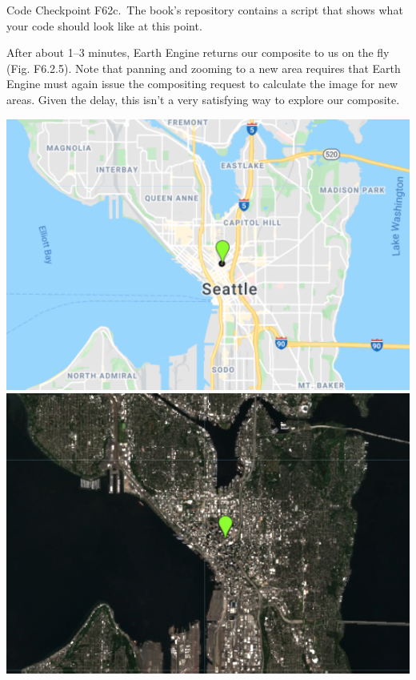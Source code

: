 \documentclass[
  letterpaper,
  DIV=11,
  numbers=noendperiod]{scrreprt}
\begin{document}
\begin{tcolorbox}[enhanced jigsaw, left=2mm, breakable, rightrule=.15mm, opacityback=0, colframe=quarto-callout-note-color-frame, colbacktitle=quarto-callout-note-color!10!white, arc=.35mm, opacitybacktitle=0.6, toptitle=1mm, colback=white, leftrule=.75mm, title=\textcolor{quarto-callout-note-color}{\faInfo}\hspace{0.5em}{Note}, toprule=.15mm, bottomtitle=1mm, titlerule=0mm, bottomrule=.15mm, coltitle=black]

Code Checkpoint F62c.~The book's repository contains a script that shows
what your code should look like at this point.

\end{tcolorbox}

After about 1--3 minutes, Earth Engine returns our composite to us on
the fly (Fig. F6.2.5). Note that panning and zooming to a new area
requires that Earth Engine must again issue the compositing request to
calculate the image for new areas. Given the delay, this isn't a very
satisfying way to explore our composite.

\includegraphics{./F6/image49.png}\includegraphics{./F6/image43.png}
\end{document}
